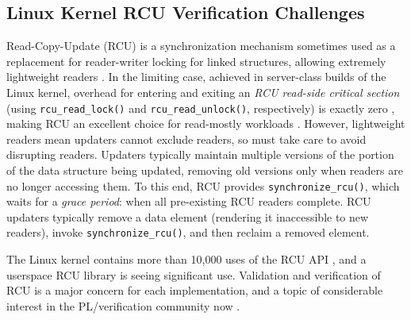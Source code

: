 \documentclass{svjour3}
\begin{document}
\subsection{Linux Kernel RCU Verification Challenges}



Read-Copy-Update (RCU) is a synchronization mechanism sometimes used as a replacement
for reader-writer locking for linked structures, allowing extremely
lightweight readers \cite{McKenney:2013:SDS:2483852.2483867}.
In the limiting case, achieved in server-class builds of the
Linux kernel, overhead for entering and exiting an \emph{RCU read-side
critical section} (using {\tt rcu\_read\_lock()} and {\tt rcu\_read\_unlock()},
respectively) is exactly zero \cite{McKenney98}, making RCU an
excellent choice for read-mostly workloads \cite{McKenney:2013:SDS:2483852.2483867,DinakarGuniguntala2008IBMSysJ,PaulMcKenney2013AMPenergyHOTPAR}.
However, lightweight readers mean updaters cannot exclude readers,
so must take care to avoid disrupting readers.
Updaters typically maintain multiple versions of the portion of the
data structure being updated, removing old versions only when
readers are no longer accessing them.
To this end, RCU provides {\tt synchronize\_rcu()}, which waits for a
\emph{grace period}: when all pre-existing RCU readers complete.
RCU updaters typically remove a data element (rendering it
inaccessible to new readers), invoke {\tt synchronize\_rcu()},
and then reclaim a removed element.

The Linux kernel contains more than 10,000 uses of the RCU
API \cite{PaulEMcKenneyRCUusagePage}, and a userspace RCU
library \cite{MathieuDesnoyers2009URCU,MathieuDesnoyers2012URCU}
is seeing significant use.  Validation and verification of RCU is a
major concern for each implementation, and a topic of considerable
interest in the PL/verification community now \cite{PLDI15RCU}.

\end{document}
